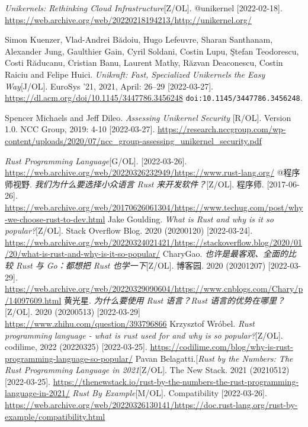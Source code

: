 \documentclass[UTF8,fontset=none,linespread=1.15]{ctexart}
\begin{document}
\begin{thebibliography}{99}
\textit{Unikernels: Rethinking Cloud Infrastructure}[Z/OL].
@unikernel [2022-02-18]. \url{https://web.archive.org/web/20220218194213/http://unikernel.org/}

 Simon Kuenzer, Vlad-Andrei Bădoiu, Hugo Lefeuvre, Sharan Santhanam,
Alexander Jung, Gaulthier Gain, Cyril Soldani, Costin Lupu, \c{S}tefan Teodorescu, Costi Răducanu,
Cristian Banu, Laurent Mathy, Răzvan Deaconescu, Costin Raiciu and Felipe Huici.
\textit{Unikraft: Fast, Specialized Unikernels the Easy Way}[J/OL]. EuroSys '21, 2021, April: 26–29
[2022-03-27]. \url{https://dl.acm.org/doi/10.1145/3447786.3456248} \texttt{doi:10.1145/3447786.3456248}.

 Spencer Michaels and Jeff Dileo. \textit{Assessing Unikernel Security
}[R/OL]. Version 1.0. NCC Group, 2019: 4-10 [2022-03-27].
\url{https://research.nccgroup.com/wp-content/uploads/2020/07/ncc_group-assessing_unikernel_security.pdf}

 \textit{Rust Programming Language}[G/OL]. [2022-03-26]. \url{https://web.archive.org/web/20220326232949/https://www.rust-lang.org/}
 @程序师视野. \textit{我们为什么要选择小众语言 Rust 来开发软件？}[Z/OL]. 程序师. [2017-06-26]. \url{https://web.archive.org/web/20170626061304/https://www.techug.com/post/why-we-choose-rust-to-dev.html}
Jake Goulding. \textit{What is Rust and why is it so popular?}[Z/OL]. Stack Overflow Blog. 2020 (20200120) [2022-03-24]. \url{https://web.archive.org/web/20220324021421/https://stackoverflow.blog/2020/01/20/what-is-rust-and-why-is-it-so-popular/}
 CharyGao. \textit{也许是最客观、全面的比较 Rust 与 Go：都想把 Rust 也学一下}[Z/OL]. 博客园. 2020 (20201207) [2022-03-29]. \url{https://web.archive.org/web/20220329090604/https://www.cnblogs.com/Chary/p/14097609.html}
 黄光星. \textit{为什么要使用 Rust 语言？Rust 语言的优势在哪里？}[Z/OL].
2020 (20200513) [2022-03-29] \url{https://www.zhihu.com/question/393796866}
 Krzysztof Wróbel. \textit{Rust programming language - what is rust used for and why is so popular?}[Z/OL]. codilime, 2022 (20220325) [2022-03-25]. \url{https://codilime.com/blog/why-is-rust-programming-language-so-popular/}
 Pavan Belagatti.[\textit{Rust by the Numbers: The Rust Programming Language in 2021}[Z/OL]. The New Stack. 2021 (20210512) [2022-03-25]. \url{https://thenewstack.io/rust-by-the-numbers-the-rust-programming-language-in-2021/}
 \textit{Rust By Example}[M/OL]. Compatibility [2022-03-26]. \url{https://web.archive.org/web/20220326130141/https://doc.rust-lang.org/rust-by-example/compatibility.html}


\end{thebibliography}
\end{document}
